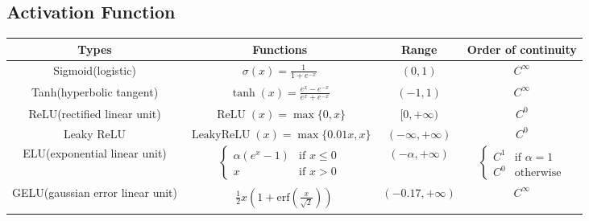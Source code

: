 \documentclass[a4paper]{article}
\theoremstyle{definition}
\newtheorem{definition}{Definition}
\theoremstyle{plain}
\begin{document}
\subsection{Activation Function}
\begin{table}[H]
\centering
\begin{tabular}{cccc}
\hline
\textbf{Types}                    & \textbf{Functions}                                       & \textbf{Range}                                           & \textbf{Order of continuity} \\ \hline
Sigmoid(logistic)        & $\sigma(x)=\frac {1}{1+e^{-x}}$               & $(0,1)$  & $C^\infty$\\
Tanh(hyperbolic tangent) & $\tanh(x)={\frac {e^{x}-e^{-x}}{e^{x}+e^{-x}}}$ & $(-1,1)$   & $C^\infty$\\
ReLU(rectified linear unit)  & $\operatorname{ReLU}(x)=\max\{0,x\}$            & $[0,+\infty)$    & $C^0$\\       
Leaky ReLU               & $\operatorname{Leaky ReLU}(x)=\max\{0.01x,x\}$  & $(-\infty,+\infty)$ & $C^0$\\
ELU(exponential linear unit)& ${\begin{cases}\alpha \left(e^{x}-1\right)&{\text{if }}x\leq 0\\x&{\text{if }}x>0\end{cases}}$ & $(-\alpha,+\infty)$ & $\begin{cases}C^{1}&{\text{if }}\alpha =1\\C^{0}&{\text{otherwise}}\end{cases}$\\ 
GELU(gaussian error linear unit)& $\begin{aligned}&{\frac {1}{2}}x\left(1+{\text{erf}}\left({\frac {x}{\sqrt {2}}}\right)\right)\end{aligned}$ & $(-0.17,+\infty)$ & $C^\infty$\\
\hline
\end{tabular}
\end{table}
\end{document}
